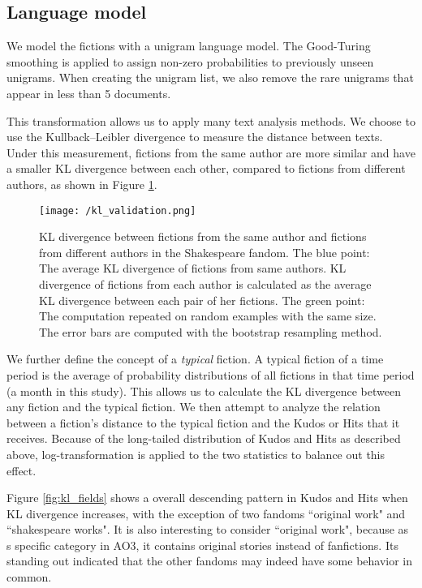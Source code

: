 \documentclass[11pt]{article} %
\begin{document}
\subsection{Language model}
We model the fictions with a unigram language model. The Good-Turing smoothing\cite{gales1995good} is applied to assign non-zero probabilities to previously unseen unigrams. When creating the unigram list, we also remove the rare unigrams that appear in less than 5 documents.

This transformation allows us to apply many text analysis methods. We choose to use the Kullback--Leibler divergence to measure the distance between texts. Under this measurement, fictions from the same author are more similar and have a smaller KL divergence between each other, compared to fictions from different authors, as shown in Figure \ref{fig:kl_validation}.

\begin{figure}[htbp]
\begin{center}
\texttt{[image: /kl\_validation.png]}
\caption{KL divergence between fictions from the same author and fictions from different authors in the Shakespeare fandom. The blue point: The average KL divergence of fictions from same authors. KL divergence of fictions from each author is calculated as the average KL divergence between each pair of her fictions. The green point: The computation repeated on random examples with the same size. The error bars are computed with the bootstrap resampling method. }
\label{fig:kl_validation}
\end{center}
\end{figure}

We further define the concept of a \emph{typical} fiction. A typical fiction of a time period is the average of probability distributions of all fictions in that time period (a month in this study). This allows us to calculate the KL divergence between any fiction and the typical fiction. We then attempt to analyze the relation between a fiction's distance to the typical fiction and the Kudos or Hits that it receives. Because of the long-tailed distribution of Kudos and Hits as described above, log-transformation is applied to the two statistics to balance out this effect. 
 
Figure \ref{fig:kl_fields} shows a overall descending pattern in Kudos and Hits when KL divergence increases, with the exception of two fandoms ``original work" and ``shakespeare works". It is also interesting to consider ``original work", because as s specific category in AO3, it contains original stories instead of fanfictions. Its standing out indicated that the other fandoms may indeed have some behavior in common. 
\end{document}
